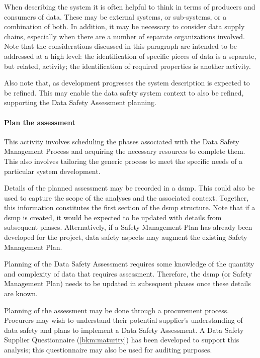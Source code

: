 When describing the system it is often helpful to think in terms of producers and consumers of data. These may be external systems, or sub-systems, or a combination of both. In addition, it may be necessary to consider data supply chains, especially when there are a number of separate organizations involved. Note that the considerations discussed in this paragraph are intended to be addressed at a high level: the identification of specific pieces of data is a separate, but related, activity; the identification of required properties is another activity.

Also note that, as development progresses the system description is expected to be refined. This may enable the data safety system context to also be refined, supporting the Data Safety Assessment planning.

\paragraph{Plan the assessment}
This activity involves scheduling the phases associated with the Data Safety Management Process and acquiring the necessary resources to complete them. This also involves tailoring the generic process to meet the specific needs of a particular system development. 

Details of the planned assessment may be recorded in a \gls{dsmp}. This could also be used to capture the scope of the analyses and the associated context. Together, this information constitutes the first section of the \gls{dsmp} structure. Note that if a \gls{dsmp} is created, it would be expected to be updated with details from subsequent phases. Alternatively, if a Safety Management Plan has already been developed for the project, data safety aspects may augment the existing Safety Management Plan. 

Planning of the Data Safety Assessment requires some knowledge of the quantity and complexity of data that requires assessment. Therefore, the \gls{dsmp} (or Safety Management Plan) needs to be updated in subsequent phases once these details are known.

Planning of the assessment may be done through a procurement process. Procurers may wish to understand their potential supplier's understanding of data safety and plans to implement a Data Safety Assessment. A Data Safety Supplier Questionnaire (\autoref{bkm:maturity}) has been developed to support this analysis; this questionnaire may also be used for auditing purposes.

